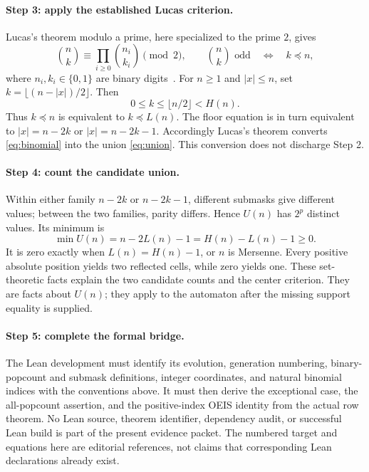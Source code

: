 \documentclass[11pt]{article}
\newcommand{\sub}{\preceq}
\begin{document}
\paragraph{Step 3: apply the established Lucas criterion.}
Lucas's theorem modulo a prime, here specialized to the prime $2$, gives
\begin{equation}
 \binom{n}{k}\equiv\prod_{i\geq0}\binom{n_i}{k_i}\pmod2,
 \qquad
 \binom{n}{k}\text{ odd}\quad\Longleftrightarrow\quad k\sub n,
 \label{eq:lucas}
\end{equation}
where $n_i,k_i\in\{0,1\}$ are binary digits~\cite{lucas}. For $n\geq1$
and $|x|\leq n$, set $k=\lfloor(n-|x|)/2\rfloor$. Then
\[
 0\leq k\leq\lfloor n/2\rfloor<H(n).
\]
Thus $k\sub n$ is equivalent to $k\sub L(n)$. The floor equation is in
turn equivalent to $|x|=n-2k$ or $|x|=n-2k-1$. Accordingly Lucas's theorem
converts \eqref{eq:binomial} into the union \eqref{eq:union}. This
conversion does not discharge Step 2.

\paragraph{Step 4: count the candidate union.}
Within either family $n-2k$ or $n-2k-1$, different submasks give different
values; between the two families, parity differs. Hence $U(n)$ has $2^p$
distinct values. Its minimum is
\begin{equation}
 \min U(n)=n-2L(n)-1=H(n)-L(n)-1\geq0.
 \label{eq:min}
\end{equation}
It is zero exactly when $L(n)=H(n)-1$, or $n$ is Mersenne. Every positive
absolute position yields two reflected cells, while zero yields one. These
set-theoretic facts explain the two candidate counts and the center
criterion. They are facts about $U(n)$; they apply to the automaton after
the missing support equality is supplied.

\paragraph{Step 5: complete the formal bridge.}
The Lean development must identify its evolution, generation numbering,
binary-popcount and submask definitions, integer coordinates, and natural
binomial indices with the conventions above. It must then derive the
exceptional case, the all-popcount assertion, and the positive-index OEIS
identity from the actual row theorem. No Lean source, theorem identifier,
dependency audit, or successful Lean build is part of the present evidence
packet. The numbered target and equations here are editorial references,
not claims that corresponding Lean declarations already exist.
\end{document}
